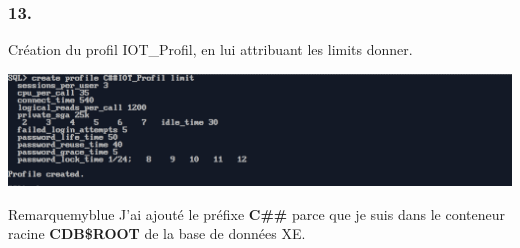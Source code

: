 \subsubsection*{13.}

Création du profil IOT\_Profil, en lui attribuant les limits donner.



\begin{center}
    \includegraphics[width=\textwidth]{ScreenShot/Partie4/profile.png}
\end{center}

\begin{prettyBox}{Remarque}{myblue}
J'ai ajouté le préfixe \textbf{C\#\#} parce que je suis dans le conteneur racine \textbf{CDB\$ROOT} de la base de données XE.
\end{prettyBox}

